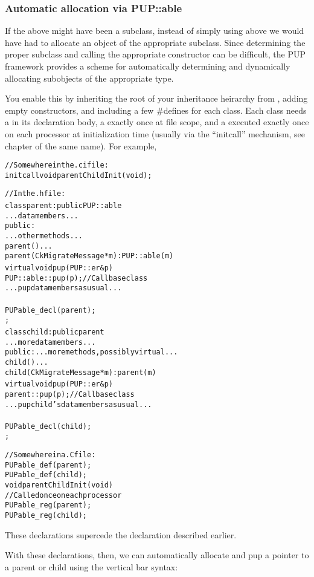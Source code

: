 \subsubsection{Automatic allocation via PUP::able}
If the  above might have been a subclass, instead of
simply using  above we would have had to allocate 
an object of the appropriate subclass.  Since determining the
proper subclass and calling the appropriate constructor can be 
difficult, the PUP framework provides a scheme for automatically
determining and dynamically allocating subobjects of the appropriate type.

You enable this by inheriting the root of your inheritance heirarchy 
from , adding empty  constructors,
and including a few \#defines for each class.
Each class needs a  in its 
declaration body, a  exactly once
at file scope, and a  executed
exactly once on each processor at initialization time (usually
via the ``initcall'' mechanism, see chapter of the same name).
For example,

\begin{alltt}
//Somewhere in the .ci file:
   initcall void parentChildInit(void);

//In the .h file:
class parent : public PUP::able {
    ... data members ...
public:
    ... other methods ...
    parent() {...}
    parent(CkMigrateMessage *m) : PUP::able(m) {}
    virtual void pup(PUP::er &p) {
        PUP::able::pup(p);//Call base class
        ... pup data members as usual ...
    }
    PUPable\_decl(parent);    
};
class child : public parent {
    ... more data members ...
public:    ... more methods, possibly virtual ...
    child() {...}
    child(CkMigrateMessage *m) : parent(m) {}
    virtual void pup(PUP::er &p) {
        parent::pup(p);//Call base class
        ... pup child's data members as usual ...
    }
    PUPable\_decl(child);    
};

//Somewhere in a .C file:
PUPable\_def(parent);
PUPable\_def(child);
void parentChildInit(void)
{//Called once on each processor
    PUPable\_reg(parent);
    PUPable\_reg(child);
}
\end{alltt}

These declarations supercede the  declaration 
described earlier.

With these declarations, then, we can automatically 
allocate and pup a pointer to a parent or child
using the vertical bar  syntax:

